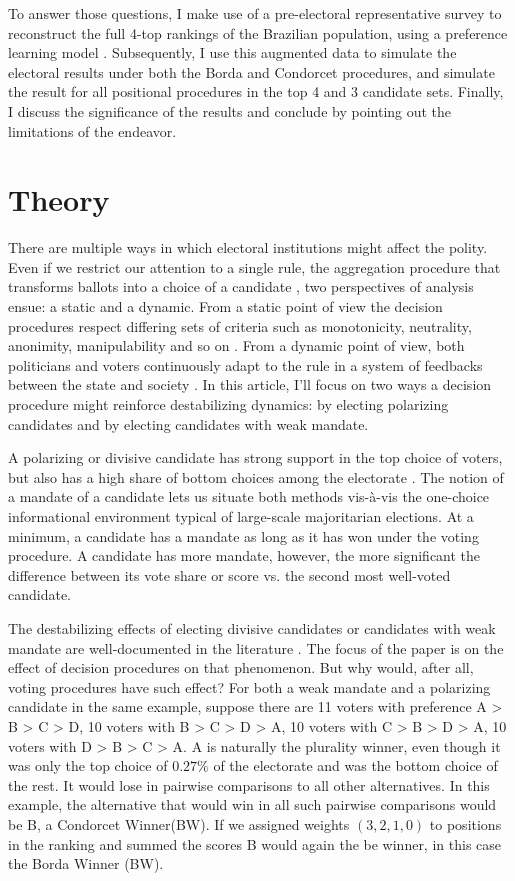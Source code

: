 \documentclass[hidelinks,11pt]{article}
\begin{document}
To answer those questions, I make use of a pre-electoral representative survey
to reconstruct the full 4-top rankings of the Brazilian population, using a
preference learning model \parencite{sorensen2019bayesmallows}. Subsequently, I
use this augmented data to simulate the electoral results under both the Borda
and Condorcet procedures, and simulate the result for all positional procedures
in the top 4 and 3 candidate sets. Finally, I discuss the significance of the
results and conclude by pointing out the limitations of the endeavor.


\section{Theory}
There are multiple ways in which electoral institutions might affect the polity. Even if we restrict our attention to a single rule, the aggregation procedure that transforms ballots into a choice of a candidate \parencite{Goodin_2006}, two perspectives of analysis ensue: a static and a dynamic. From a static point of view the decision procedures respect differing sets of criteria such as monotonicity, neutrality, anonimity, manipulability and so on \parencite{nurmi1999voting}. From a dynamic point of view, both politicians and voters continuously adapt to the rule in a system of feedbacks between the state and society \parencite{Wange2021systems}. In this article, I'll focus on two ways a decision procedure might reinforce destabilizing dynamics: by electing polarizing candidates and by electing candidates with weak mandate.


A polarizing or divisive candidate has strong support in the top
choice of voters, but also has a high share of bottom choices among the
electorate \parencite{igersheim22_compar_votin_method}.
The notion of a mandate of a candidate lets us situate both methods vis-à-vis
the one-choice informational environment typical of large-scale majoritarian
elections. At a minimum, a candidate has a mandate as long as it has won
under the voting procedure. A candidate has more mandate, however, the more significant
the difference between its vote share or score vs. the second most well-voted
candidate.

The destabilizing effects of electing divisive candidates or candidates with weak mandate are well-documented in the literature \parencite{kaminski2015empirical, luhrmann2018democracy, Baldassarrie2116863118, Bednare2113843118}. The focus of the paper is on the effect of decision procedures on that phenomenon. But why would, after all, voting procedures have such effect? For both a weak mandate and a polarizing candidate in the same example, suppose there are 11 voters with preference A > B > C > D, 10 voters with B > C > D > A, 10 voters with  C > B > D > A, 10 voters with D > B > C > A.  A is naturally the plurality winner, even though it was only the top choice of \(0.27\%\) of the electorate and was the bottom choice of the rest. It would lose in pairwise comparisons to all other alternatives. In this example, the alternative that would win in all such pairwise comparisons would be B, a Condorcet Winner(BW). If we assigned weights \((3,2,1,0)\) to positions in the ranking and summed the scores B would again the be winner, in this case the Borda Winner (BW).
\end{document}
